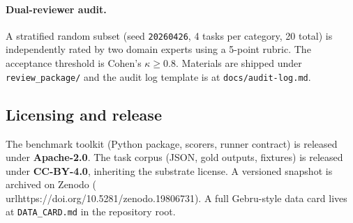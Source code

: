\paragraph{Dual-reviewer audit.} A stratified random subset (seed
\texttt{20260426}, 4 tasks per category, 20 total) is independently rated by
two domain experts using a 5-point rubric. The acceptance threshold is Cohen's
$\kappa \geq 0.8$. Materials are shipped under \texttt{review\_package/} and
the audit log template is at \texttt{docs/audit-log.md}.

\subsection{Licensing and release}

The benchmark toolkit (Python package, scorers, runner contract) is released
under \textbf{Apache-2.0}. The task corpus (JSON, gold outputs, fixtures) is
released under \textbf{CC-BY-4.0}, inheriting the substrate license. A
versioned snapshot is archived on Zenodo
(\\url{https://doi.org/10.5281/zenodo.19806731}).
A full Gebru-style data card lives at \texttt{DATA\_CARD.md} in the repository
root.

